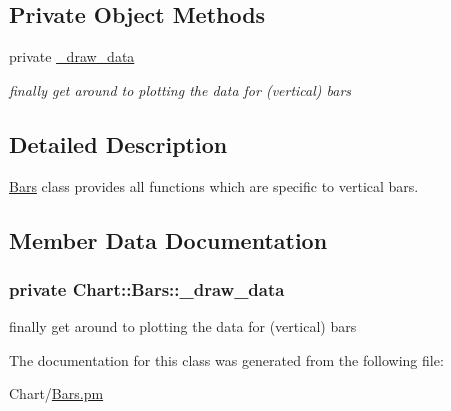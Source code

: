 \subsection*{Private Object Methods}
\label{_amgrp57eb0ba2c0003ce1a95a820bfa03b4b4}
 \begin{DoxyCompactItemize}
\item 
private \hyperlink{classChart_1_1Bars_ac15f867b92bbe0edcf3d971dc3a81812}{\_\-draw\_\-data}
\begin{DoxyCompactList}\small\item\em finally get around to plotting the data for (vertical) bars \item\end{DoxyCompactList}\end{DoxyCompactItemize}


\subsection{Detailed Description}
\hyperlink{classChart_1_1Bars}{Bars} class provides all functions which are specific to vertical bars. 

\subsection{Member Data Documentation}
\hypertarget{classChart_1_1Bars_ac15f867b92bbe0edcf3d971dc3a81812}{
\subsubsection[{\_\-draw\_\-data}]{\setlength{\rightskip}{0pt plus 5cm}private {\bf Chart::Bars::\_\-draw\_\-data}}}
\label{classChart_1_1Bars_ac15f867b92bbe0edcf3d971dc3a81812}


finally get around to plotting the data for (vertical) bars 



The documentation for this class was generated from the following file:\begin{DoxyCompactItemize}
\item 
Chart/\hyperlink{Bars_8pm}{Bars.pm}\end{DoxyCompactItemize}

